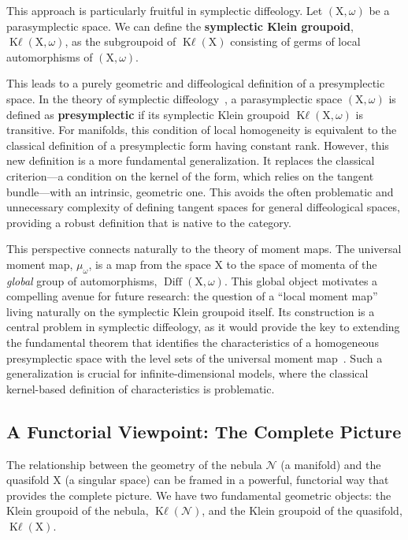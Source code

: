 \documentclass[10pt,reqno,letterpaper,twoside]{amsart}
\theoremstyle{article}
\newcommand{\cN}{{\mathcal N}}
\def \K{\mathrm K}
\def \X{\mathrm X}
\DeclareMathOperator{\Diff}{Diff}
\DeclareMathOperator{\Kl}{{\K\ell}}
\begin{document}
  This approach is particularly fruitful in symplectic diffeology.
  Let $(\X, \omega)$ be a parasymplectic space.
  We can define the \textbf{symplectic Klein groupoid},
  $\Kl(\X, \omega)$,
  as the subgroupoid of $\Kl(\X)$ consisting of germs of local automorphisms of $(\X,\omega)$.
  
  This leads to a purely geometric and diffeological definition of a presymplectic space.
  In the theory of symplectic diffeology~\cite{PIZ10},
  a parasymplectic space $(\X, \omega)$ is defined as \textbf{presymplectic} if its symplectic Klein groupoid $\Kl(\X, \omega)$ is transitive.
  For manifolds,
  this condition of local homogeneity is equivalent to the classical definition of a presymplectic form having constant rank.
  However,
  this new definition is a more fundamental generalization.
  It replaces the classical criterion—a condition on the kernel of the form,
  which relies on the tangent bundle—with an intrinsic, geometric one.
  This avoids the often problematic and unnecessary complexity of defining tangent spaces for general diffeological spaces,
  providing a robust definition that is native to the category.
  
  This perspective connects naturally to the theory of moment maps.
  The universal moment map, $\mu_\omega$,
  is a map from the space $\X$ to the space of momenta of the \emph{global} group of automorphisms,
  $\Diff(\X,\omega)$.
  This global object motivates a compelling avenue for future research: the question of a ``local moment map'' living naturally on the symplectic Klein groupoid itself.
  Its construction is a central problem in symplectic diffeology,
  as it would provide the key to extending the fundamental theorem that identifies the characteristics of a homogeneous presymplectic space with the level sets of the universal moment map~\cite[]{PIZ13}.
  Such a generalization is crucial for infinite-dimensional models,
  where the classical kernel-based definition of characteristics is problematic.
  
  \subsection{A Functorial Viewpoint: The Complete Picture}
  
  The relationship between the geometry of the nebula $\cN$ (a manifold) and the quasifold $\X$ (a singular space) can be framed in a powerful,
  functorial way that provides the complete picture.
  We have two fundamental geometric objects: the Klein groupoid of the nebula,
  $\Kl(\cN)$,
  and the Klein groupoid of the quasifold,
  $\Kl(\X)$.
  
\end{document}
